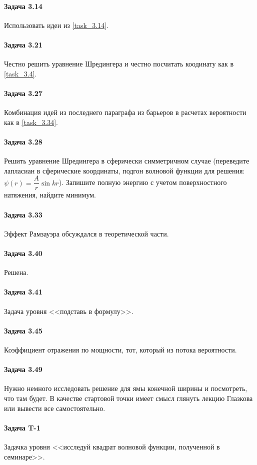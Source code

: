 \documentclass[12pt]{article}
\begin{document}
\paragraph{Задача 3.14} Использовать идеи из \ref{task_3.14}.

\paragraph{Задача 3.21} Честно решить уравнение Шредингера и честно посчитать коодинату как в \ref{task_3.4}.

\paragraph{Задача 3.27} Комбинация идей из последнего параграфа из барьеров в расчетах вероятности как в \ref{task_3.34}.

\paragraph{Задача 3.28} Решить уравнение Шредингера в сферически симметричном случае (переведите лапласиан в сферические координаты, подгон волновой функции для решения: $\psi(r) = \dfrac{A}{r}\sin{kr}$). Запишите полную энергию с учетом поверхностного натяжения, найдите минимум.

\paragraph{Задача 3.33} Эффект Рамзауэра обсуждался в теоретической части.

\paragraph{Задача 3.40} Решена.

\paragraph{Задача 3.41} Задача уровня <<подставь в формулу>>.

\paragraph{Задача 3.45} Коэффициент отражения по мощности, тот, который из потока вероятности.

\paragraph{Задача 3.49} Нужно немного исследовать решение для ямы конечной ширины и посмотреть, что там будет. В качестве стартовой точки имеет смысл глянуть лекцию Глазкова или вывести все самостоятельно.

\paragraph{Задача T-1} Задачка уровня <<исследуй квадрат волновой функции, полученной в семинаре>>.
\end{document}
